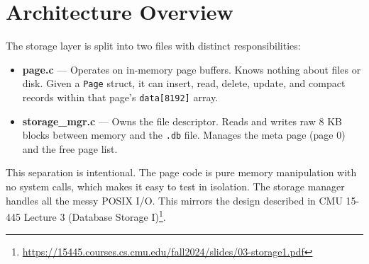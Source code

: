 \documentclass[12pt, a4paper]{report}
\begin{document}
\section{Architecture Overview}

The storage layer is split into two files with distinct responsibilities:

\begin{center}
\end{center}

\begin{itemize}[itemsep=4pt]
    \item \textbf{page.c} --- Operates on in-memory page buffers. Knows nothing
          about files or disk. Given a \texttt{Page} struct, it can insert,
          read, delete, update, and compact records within that page's
          \texttt{data[8192]} array.
    \item \textbf{storage\_mgr.c} --- Owns the file descriptor. Reads and
          writes raw 8 KB blocks between memory and the \texttt{.db} file.
          Manages the meta page (page 0) and the free page list.
\end{itemize}

This separation is intentional. The page code is pure memory manipulation with
no system calls, which makes it easy to test in isolation. The storage manager
handles all the messy POSIX I/O. This mirrors the design described in CMU
15-445 Lecture 3 (Database Storage I)\footnote{%
\url{https://15445.courses.cs.cmu.edu/fall2024/slides/03-storage1.pdf}}.
\end{document}
